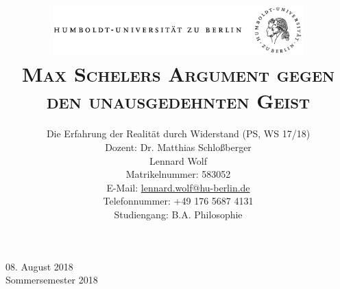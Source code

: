 \documentclass[a4paper, 12pt]{article}
\date{\vspace{-3ex}}
\begin{document}
\title{\vspace{5ex}
	\includegraphics*[bb=0 0 720 200, width=0.72\textwidth]{ErstesSem/images/hu_logo.png}\\
	\vspace{30pt}
	\scshape\LARGE{Max Schelers Argument gegen den unausgedehnten Geist}\\\vspace{20pt}}
	


\author{Die Erfahrung der Realität durch Widerstand (PS, WS 17/18)\\
	\vspace{7pt}
          Dozent: Dr. Matthias Schloßberger\\\vspace{4pt}Lennard Wolf\\
        \small{Matrikelnummer: 583052}\\
        \small{E-Mail: \href{mailto:lennard.wolf@hu-berlin.de}{lennard.wolf@hu-berlin.de}}\\
        \small{Telefonnummer: +49 176 5687 4131}\\
        \small{Studiengang: B.A. Philosophie}}

\maketitle

\vspace{\fill}

\begin{minipage}[]{0.92\textwidth}
    \centering
    \onehalfspacing
    \large   
    08. August 2018\\
    Sommersemester 2018

    \vspace{-20mm} 
\end{minipage}%
\thispagestyle{empty}
\newpage
\setcounter{page}{1}
\end{document}
